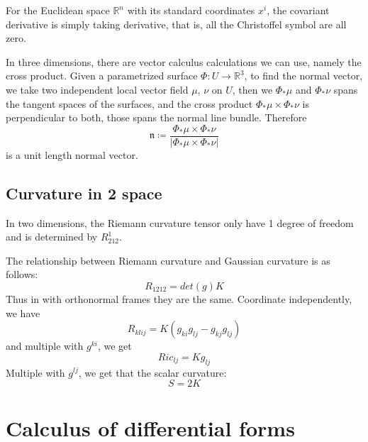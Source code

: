 \documentclass[main.tex]{subfiles}
\begin{document}
For the Euclidean space $\mathbb{R}^n$ with its standard coordinates $x^i$, the covariant derivative is simply taking derivative, that is, all the Christoffel symbol are all zero.

In three dimensions, there are vector calculus calculations we can use, namely the cross product. Given a parametrized surface $\Phi: U \rightarrow \mathbb{R}^3$, to find the normal vector, we take two independent local vector field $\mu$, $\nu$ on $U$, then we $\Phi_* {\mu}$ and $\Phi_* \nu$ spans the tangent spaces of the surfaces, and the cross product $\Phi_* \mu \times \Phi_* \nu$ is perpendicular to both, those spans the normal line bundle. Therefore 
$$
\mathfrak{n} \coloneqq \frac{\Phi_* \mu \times \Phi_* \nu}{|\Phi_* \mu \times \Phi_* \nu|}
$$
is a unit length normal vector. 

\subsection{Curvature in 2 space}

In two dimensions, the Riemann curvature tensor only have 1 degree of freedom and is determined by 
$R^1 _{212}$. 

The relationship between Riemann curvature and Gaussian curvature is as follows:
$$
R_{1212} = det(g) K
$$
Thus in with orthonormal frames they are the same. Coordinate independently, we have 
$$
R_{klij} = K (g_{ki}g_{lj} - g_{kj}g_{lj})
$$
and multiple with $g^{ki}$, we get 
$$
Ric_{lj} = K g_{lj}
$$
Multiple with $g^{lj}$, we get that the scalar curvature:
$$
S = 2K
$$






\section{Calculus of differential forms}
\end{document}
